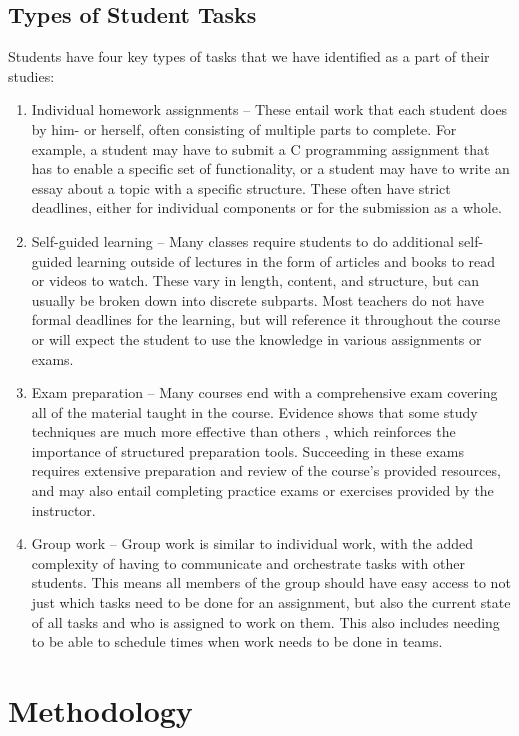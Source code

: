 \documentclass[11pt,oneside]{article}
\begin{document}
\subsection{Types of Student Tasks}
Students have four key types of tasks that we have identified as a part of their studies: 

\begin{enumerate}
\item Individual homework assignments – These entail work that each student does by him- or herself, often consisting of multiple parts to complete. For example, a student may have to submit a C programming assignment that has to enable a specific set of functionality, or a student may have to write an essay about a topic with a specific structure. These often have strict deadlines, either for individual components or for the submission as a whole.
\item Self-guided learning – Many classes require students to do additional self-guided learning outside of lectures in the form of articles and books to read or videos to watch. These vary in length, content, and structure, but can usually be broken down into discrete subparts. Most teachers do not have formal deadlines for the learning, but will reference it throughout the course or will expect the student to use the knowledge in various assignments or exams.
\item Exam preparation – Many courses end with a comprehensive exam covering all of the material taught in the course. Evidence shows that some study techniques are much more effective than others \citep{dunlosky2013improving}, which reinforces the importance of structured preparation tools. Succeeding in these exams requires extensive preparation and review of the course’s provided resources, and may also entail completing practice exams or exercises provided by the instructor.
\item Group work – Group work is similar to individual work, with the added complexity of having to communicate and orchestrate tasks with other students. This means all members of the group should have easy access to not just which tasks need to be done for an assignment, but also the current state of all tasks and who is assigned to work on them. This also includes needing to be able to schedule times when work needs to be done in teams.
\end{enumerate}

\section{Methodology}
\end{document}
